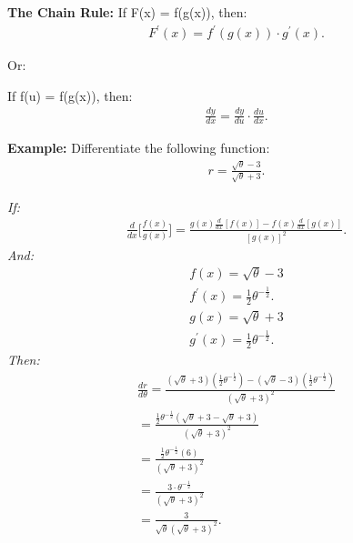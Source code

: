 \documentclass{report}
\begin{document}
  \bigbreak \noindent 
  \begin{mdframed}
    \textbf{The Chain Rule:}
    \bigbreak \noindent 
    If F(x) = f(g(x)), then:
    \begin{align*}
      F ^{\prime}(x) = f ^{\prime}(g(x)) \cdot g ^{\prime}(x)
    .\end{align*}
    \begin{center}
      Or:
    \end{center}
    \bigbreak \noindent 
    If f(u) = f(g(x)), then:
    \begin{align*}
      \frac{dy}{dx} = \frac{dy}{du} \cdot \frac{du}{dx}
    .\end{align*}
  \end{mdframed}
  \bigbreak \noindent 
  \begin{mdframed}
    \textbf{Example:} Differentiate the following function:
    \begin{align*}
      r = \frac{ \sqrt{\theta} -3}{ \sqrt{\theta} +3}
    .\end{align*}
  \end{mdframed}
  \bigbreak \noindent 
  \textit{If:}
  \begin{align*}
    \frac{d}{dx}\bigg[ \frac{f(x)}{g(x)}\bigg] = \frac{g(x) \frac{d}{dx}[f(x)] - f(x) \frac{d}{dx}[g(x)]}{[g(x)]^2}
  .\end{align*}
  \bigbreak \noindent 
  \textit{And:}
  \begin{align*}
    f(x) = \sqrt{ \theta } -3 \\
    f ^{\prime}(x) = \frac{1}{2} \theta^{- \frac{1}{2}}
  .\end{align*}
  \begin{align*}
    g(x) = \sqrt{ \theta } + 3 \\ 
    g ^{\prime}(x) = \frac{1}{2} \theta^{- \frac{1}{2}}
  .\end{align*}
  \bigbreak \noindent 
  \textit{Then:}
  \begin{align*}
    \frac{dr}{d\theta} = \frac{( \sqrt{ \theta } +3)( \frac{1}{2} \theta^{- \frac{1}{2}}) - ( \sqrt{ \theta } -3)( \frac{1}{2} \theta ^{-\frac{1}{2}})}{ ( \sqrt{ \theta } + 3)^2} \\ 
    = \frac{ \frac{1}{2} \theta^{-\frac{1}{2}}( \sqrt{ \theta }+3 - \sqrt{ \theta } +3)}{(\sqrt{ \theta } +3)^2} \\ 
    = \frac{\frac{1}{2} \theta^{-\frac{1}{2}}(6)}{(\sqrt{ \theta } +3)^2} \\
    = \frac{3 \cdot  \theta ^{-\frac{1}{2}}}{(\sqrt{ \theta } +3)^2} \\ 
    = \frac{3}{ \sqrt{ \theta }(\sqrt{ \theta } +3)^2}
  .\end{align*}
  \bigbreak \noindent 
\end{document}
